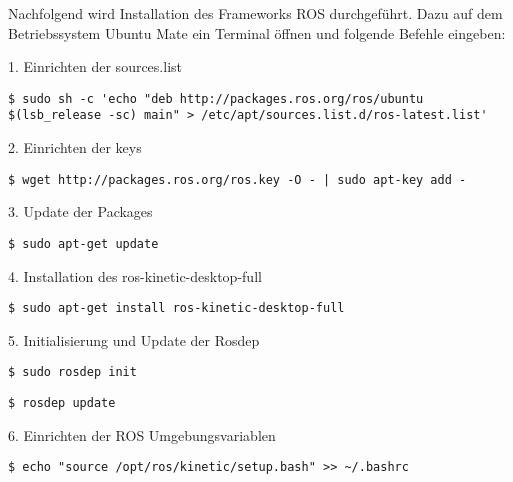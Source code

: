 Nachfolgend wird Installation des Frameworks ROS durchgeführt. Dazu auf dem Betriebssystem Ubuntu Mate ein Terminal öffnen und folgende Befehle eingeben:

1. Einrichten der sources.list\\

\begin{lstlisting}
$ sudo sh -c 'echo "deb http://packages.ros.org/ros/ubuntu $(lsb_release -sc) main" > /etc/apt/sources.list.d/ros-latest.list'
\end{lstlisting}
\vspace{-0.8cm}

2. Einrichten der keys\\

\begin{lstlisting}
$ wget http://packages.ros.org/ros.key -O - | sudo apt-key add -
\end{lstlisting}
\vspace{-0.8cm}

3. Update der Packages\\

\begin{lstlisting}
$ sudo apt-get update
\end{lstlisting}
\vspace{-0.8cm}

4. Installation des ros-kinetic-desktop-full\\

\begin{lstlisting}
$ sudo apt-get install ros-kinetic-desktop-full
\end{lstlisting}
\vspace{-0.8cm}

5. Initialisierung und Update der Rosdep\\

\begin{lstlisting}
$ sudo rosdep init
\end{lstlisting}

\begin{lstlisting}
$ rosdep update
\end{lstlisting}
\vspace{-0.8cm}

6. Einrichten der ROS Umgebungsvariablen\\

\begin{lstlisting}
$ echo "source /opt/ros/kinetic/setup.bash" >> ~/.bashrc
\end{lstlisting}
\vspace{-0.8cm}

